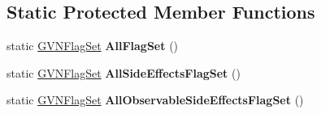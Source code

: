 \subsection*{Static Protected Member Functions}
\begin{DoxyCompactItemize}
\item 
static \hyperlink{classv8_1_1internal_1_1_enum_set}{G\+V\+N\+Flag\+Set} {\bfseries All\+Flag\+Set} ()\hypertarget{classv8_1_1internal_1_1_h_value_ab4c5d0e61acf3c9edf35545cfb3c78b1}{}\label{classv8_1_1internal_1_1_h_value_ab4c5d0e61acf3c9edf35545cfb3c78b1}

\item 
static \hyperlink{classv8_1_1internal_1_1_enum_set}{G\+V\+N\+Flag\+Set} {\bfseries All\+Side\+Effects\+Flag\+Set} ()\hypertarget{classv8_1_1internal_1_1_h_value_ad9f87c0bc07ff6317b6fea3ee9896ecc}{}\label{classv8_1_1internal_1_1_h_value_ad9f87c0bc07ff6317b6fea3ee9896ecc}

\item 
static \hyperlink{classv8_1_1internal_1_1_enum_set}{G\+V\+N\+Flag\+Set} {\bfseries All\+Observable\+Side\+Effects\+Flag\+Set} ()\hypertarget{classv8_1_1internal_1_1_h_value_a4fbae5809126b5aa755ae69841dda7fd}{}\label{classv8_1_1internal_1_1_h_value_a4fbae5809126b5aa755ae69841dda7fd}

\end{DoxyCompactItemize}
